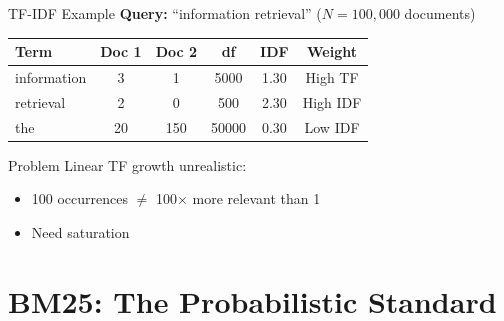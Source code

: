 \documentclass[aspectratio=169]{beamer}
\newif\ifanimated
\newcommand{\cpause}{\ifanimated\pause\fi}
\begin{document}
\begin{frame}{TF-IDF Example}
\textbf{Query:} ``information retrieval'' \quad ($N = 100{,}000$ documents)

\vspace{1em}

\begin{table}
\centering
\small
\begin{tabular}{lccccc}
\toprule
\textbf{Term} & \textbf{Doc 1} & \textbf{Doc 2} & \textbf{df} & \textbf{IDF} & \textbf{Weight} \\
\midrule
information & 3 & 1 & 5000 & 1.30 & High TF \\
retrieval & 2 & 0 & 500 & 2.30 & High IDF \\
the & 20 & 150 & 50000 & 0.30 & Low IDF \\
\bottomrule
\end{tabular}
\end{table}

\vspace{1em}


\cpause
\begin{alertblock}{Problem}
Linear TF growth unrealistic:
\begin{itemize}
    \item 100 occurrences $\neq$ 100$\times$ more relevant than 1
    \item Need saturation
\end{itemize}
\end{alertblock}

\end{frame}

\section{BM25: The Probabilistic Standard}
\end{document}
